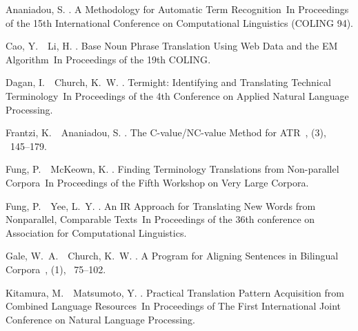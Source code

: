 \documentclass[japanese]{jnlp_1.3e}
\begin{document}

\begin{thebibliography}{}

Ananiadou, S. \BBCP.
\newblock \BBOQ A Methodology for Automatic Term Recognition\BBCQ\
\newblock In {\Bem Proceedings of the 15th International Conference on
  Computational Linguistics (COLING 94)}.

Cao, Y.\BBACOMMA\ \BBA\ Li, H. \BBOP 2002\BBCP.
\newblock \BBOQ Base Noun Phrase Translation Using Web Data and the EM
  Algorithm\BBCQ\
\newblock In {\Bem Proceedings of the 19th COLING}.

Dagan, I.\BBACOMMA\ \BBA\ Church, K.~W. \BBCP.
\newblock \BBOQ Termight: Identifying and Translating Technical
  Terminology\BBCQ\
\newblock In {\Bem Proceedings of the 4th Conference on Applied Natural
  Language Processing}.

Frantzi, K.\BBACOMMA\ \BBA\ Ananiadou, S. \BBOP 1999\BBCP.
\newblock \BBOQ The C-value/NC-value Method for ATR\BBCQ\
, {}  (3), \mbox{\BPGS\ 145--179}.

Fung, P.\BBACOMMA\ \BBA\ McKeown, K. \BBCP.
\newblock \BBOQ Finding Terminology Translations from Non-parallel
  Corpora\BBCQ\
\newblock In {\Bem Proceedings of the Fifth Workshop on Very Large Corpora}.

Fung, P.\BBACOMMA\ \BBA\ Yee, L.~Y. \BBOP 1998\BBCP.
\newblock \BBOQ An IR Approach for Translating New Words from Nonparallel,
  Comparable Texts\BBCQ\
\newblock In {\Bem Proceedings of the 36th conference on Association for
  Computational Linguistics}.

Gale, W.~A.\BBACOMMA\ \BBA\ Church, K.~W. \BBCP.
\newblock \BBOQ A Program for Aligning Sentences in Bilingual Corpora\BBCQ\
, {}  (1), \mbox{\BPGS\
  75--102}.

Kitamura, M.\BBACOMMA\ \BBA\ Matsumoto, Y. \BBCP.
\newblock \BBOQ Practical Translation Pattern Acquisition from Combined
  Language Resources\BBCQ\
\newblock In {\Bem Proceedings of The First International Joint Conference on
  Natural Language Processing}.


\end{thebibliography}
\end{document}
